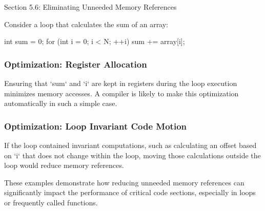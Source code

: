 \begin{notes}{Section 5.6: Eliminating Unneeded Memory References}
    \begin{highlight}
        Consider a loop that calculates the sum of an array:
    
    \begin{code}[C]
    int sum = 0;
    for (int i = 0; i < N; ++i) {
        sum += array[i];
    }
    \end{code}
    
        \subsubsection*{Optimization: Register Allocation}
    
        Ensuring that `sum` and `i` are kept in registers during the loop execution minimizes memory accesses. A compiler is likely to make this optimization automatically in such a simple case.
    
        \subsubsection*{Optimization: Loop Invariant Code Motion}
    
        If the loop contained invariant computations, such as calculating an offset based on `i` that does not change within the loop, moving those calculations outside the loop would reduce memory references.
    
        These examples demonstrate how reducing unneeded memory references can significantly impact the performance of critical code sections, especially in loops or frequently called functions.
    \end{highlight}    
\end{notes}